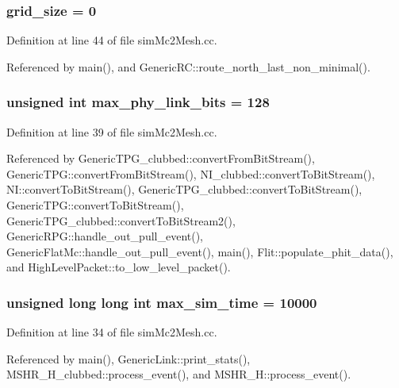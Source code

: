\subsubsection[{grid\_\-size}]{ {\bf grid\_\-size} = 0}\label{simMc2Mesh_8cc_7cdd59c13b3ee2f719faf442120c1411}




Definition at line 44 of file simMc2Mesh.cc.

Referenced by main(), and GenericRC::route\_\-north\_\-last\_\-non\_\-minimal().
\subsubsection[{max\_\-phy\_\-link\_\-bits}]{\setlength{\rightskip}{0pt plus 5cm}unsigned int {\bf max\_\-phy\_\-link\_\-bits} = 128}\label{simMc2Mesh_8cc_81294da08255fbf06c1a30ee6d52059f}




Definition at line 39 of file simMc2Mesh.cc.

Referenced by GenericTPG\_\-clubbed::convertFromBitStream(), GenericTPG::convertFromBitStream(), NI\_\-clubbed::convertToBitStream(), NI::convertToBitStream(), GenericTPG\_\-clubbed::convertToBitStream(), GenericTPG::convertToBitStream(), GenericTPG\_\-clubbed::convertToBitStream2(), GenericRPG::handle\_\-out\_\-pull\_\-event(), GenericFlatMc::handle\_\-out\_\-pull\_\-event(), main(), Flit::populate\_\-phit\_\-data(), and HighLevelPacket::to\_\-low\_\-level\_\-packet().
\subsubsection[{max\_\-sim\_\-time}]{\setlength{\rightskip}{0pt plus 5cm}unsigned long long int {\bf max\_\-sim\_\-time} = 10000}\label{simMc2Mesh_8cc_35eb3b8621b39fb3b39217f5fb55bb31}




Definition at line 34 of file simMc2Mesh.cc.

Referenced by main(), GenericLink::print\_\-stats(), MSHR\_\-H\_\-clubbed::process\_\-event(), and MSHR\_\-H::process\_\-event().
